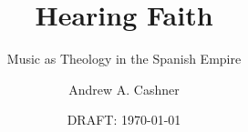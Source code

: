 \title{Hearing Faith}
\subtitle{Music as Theology in the Spanish Empire}
\author{Andrew A. Cashner}
\date{DRAFT: \today}
\endinput

